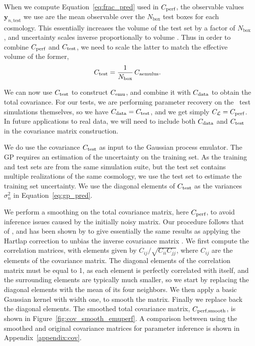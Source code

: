 When we compute Equation~\eqref{eq:frac_pred} used in $C_\text{perf}$, the observable values $\bm{y}_{n,\mathrm{test}}$ we use are the mean observable over the $N_\mathrm{box}$ test boxes for each cosmology.
This essentially increases the volume of the test set by a factor of $N_\mathrm{box}$, and uncertainty scales inverse proportionally to volume \citep{KlypinPrada2018}.
Thus in order to combine $C_\text{perf}$ and $C_\text{test}$, we need to scale the latter to match the effective volume of the former,
\begin{equation}
    C_\text{test} = \frac{1}{N_\mathrm{box}} \, C_\text{aemulus} .
\end{equation}

We can now use $C_\text{test}$ to construct $C_\text{emu}$, and combine it with $C_\text{data}$ to obtain the total covariance.
For our tests, we are performing parameter recovery on the \aemulus\ test simulations themselves, so we have $C_\text{data} = C_\text{test}$, and we get simply $C_{\mathcal{L}} = C_\text{perf}$.
In future applications to real data, we will need to include both $C_\text{data}$ and $C_\text{test}$ in the covariance matrix construction.

We do use the \aemulus covariance $C_\text{test}$ as input to the Gaussian process emulator.
The GP requires an estimation of the uncertainty on the training set.
As the training and test sets are from the same simulation suite, but the test set contains multiple realizations of the same cosmology, we use the test set to estimate the training set uncertainty.
We use the diagonal elements of $C_\text{test}$ as the variances $\sigma_n^2$ in Equation~\eqref{eq:gp_pred}.

We perform a smoothing on the total covariance matrix, here $C_\text{perf}$, to avoid inference issues caused by the initially noisy matrix.
Our procedure follows that of \cite{Lange2022}, and has been shown by \cite{Mandelbaum2013} to give essentially the same results as applying the Hartlap correction to unbias the inverse covariance matrix \citep{Hartlap2007}.
We first compute the correlation matrices, with elements given by $C_{ij}/\sqrt{C_{ii}C_{jj}}$, where $C_{ij}$ are the elements of the covariance matrix.
The diagonal elements of the correlation matrix must be equal to 1, as each element is perfectly correlated with itself, and the surrounding elements are typically much smaller, so we start by replacing the diagonal elements with the mean of its four neighbors.
We then apply a basic Gaussian kernel with width one, to smooth the matrix.
Finally we replace back the diagonal elements.
The smoothed total covariance matrix, $C_\text{perf,smooth}$, is shown in Figure~\ref{fig:cov_smooth_emuperf}.
A comparison between using the smoothed and original covariance matrices for parameter inference is shown in Appendix~\ref{appendix:cov}.


